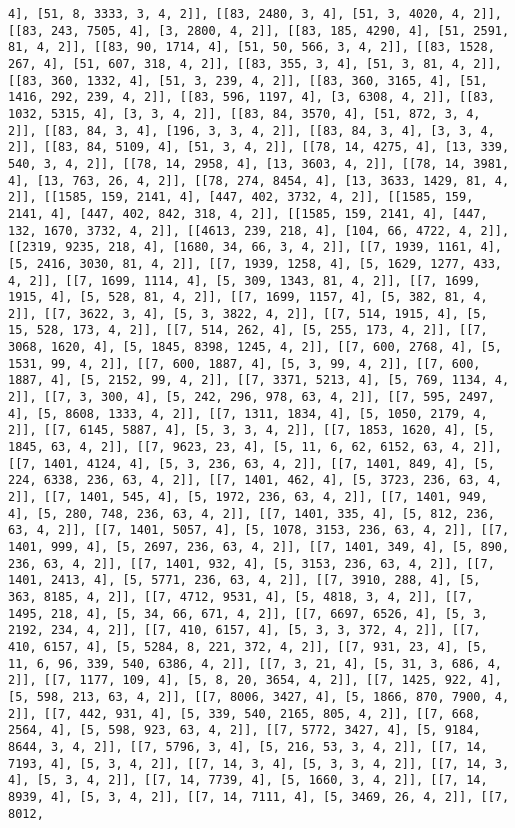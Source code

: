 \documentclass[12pt,fleqn]{article}\usepackage{../../common}
\begin{document}
\begin{verbatim}
4], [51, 8, 3333, 3, 4, 2]], [[83, 2480, 3, 4], [51, 3, 4020, 4, 2]], [[83, 243, 7505, 4], [3, 2800, 4, 2]], [[83, 185, 4290, 4], [51, 2591, 81, 4, 2]], [[83, 90, 1714, 4], [51, 50, 566, 3, 4, 2]], [[83, 1528, 267, 4], [51, 607, 318, 4, 2]], [[83, 355, 3, 4], [51, 3, 81, 4, 2]], [[83, 360, 1332, 4], [51, 3, 239, 4, 2]], [[83, 360, 3165, 4], [51, 1416, 292, 239, 4, 2]], [[83, 596, 1197, 4], [3, 6308, 4, 2]], [[83, 1032, 5315, 4], [3, 3, 4, 2]], [[83, 84, 3570, 4], [51, 872, 3, 4, 2]], [[83, 84, 3, 4], [196, 3, 3, 4, 2]], [[83, 84, 3, 4], [3, 3, 4, 2]], [[83, 84, 5109, 4], [51, 3, 4, 2]], [[78, 14, 4275, 4], [13, 339, 540, 3, 4, 2]], [[78, 14, 2958, 4], [13, 3603, 4, 2]], [[78, 14, 3981, 4], [13, 763, 26, 4, 2]], [[78, 274, 8454, 4], [13, 3633, 1429, 81, 4, 2]], [[1585, 159, 2141, 4], [447, 402, 3732, 4, 2]], [[1585, 159, 2141, 4], [447, 402, 842, 318, 4, 2]], [[1585, 159, 2141, 4], [447, 132, 1670, 3732, 4, 2]], [[4613, 239, 218, 4], [104, 66, 4722, 4, 2]], [[2319, 9235, 218, 4], [1680, 34, 66, 3, 4, 2]], [[7, 1939, 1161, 4], [5, 2416, 3030, 81, 4, 2]], [[7, 1939, 1258, 4], [5, 1629, 1277, 433, 4, 2]], [[7, 1699, 1114, 4], [5, 309, 1343, 81, 4, 2]], [[7, 1699, 1915, 4], [5, 528, 81, 4, 2]], [[7, 1699, 1157, 4], [5, 382, 81, 4, 2]], [[7, 3622, 3, 4], [5, 3, 3822, 4, 2]], [[7, 514, 1915, 4], [5, 15, 528, 173, 4, 2]], [[7, 514, 262, 4], [5, 255, 173, 4, 2]], [[7, 3068, 1620, 4], [5, 1845, 8398, 1245, 4, 2]], [[7, 600, 2768, 4], [5, 1531, 99, 4, 2]], [[7, 600, 1887, 4], [5, 3, 99, 4, 2]], [[7, 600, 1887, 4], [5, 2152, 99, 4, 2]], [[7, 3371, 5213, 4], [5, 769, 1134, 4, 2]], [[7, 3, 300, 4], [5, 242, 296, 978, 63, 4, 2]], [[7, 595, 2497, 4], [5, 8608, 1333, 4, 2]], [[7, 1311, 1834, 4], [5, 1050, 2179, 4, 2]], [[7, 6145, 5887, 4], [5, 3, 3, 4, 2]], [[7, 1853, 1620, 4], [5, 1845, 63, 4, 2]], [[7, 9623, 23, 4], [5, 11, 6, 62, 6152, 63, 4, 2]], [[7, 1401, 4124, 4], [5, 3, 236, 63, 4, 2]], [[7, 1401, 849, 4], [5, 224, 6338, 236, 63, 4, 2]], [[7, 1401, 462, 4], [5, 3723, 236, 63, 4, 2]], [[7, 1401, 545, 4], [5, 1972, 236, 63, 4, 2]], [[7, 1401, 949, 4], [5, 280, 748, 236, 63, 4, 2]], [[7, 1401, 335, 4], [5, 812, 236, 63, 4, 2]], [[7, 1401, 5057, 4], [5, 1078, 3153, 236, 63, 4, 2]], [[7, 1401, 999, 4], [5, 2697, 236, 63, 4, 2]], [[7, 1401, 349, 4], [5, 890, 236, 63, 4, 2]], [[7, 1401, 932, 4], [5, 3153, 236, 63, 4, 2]], [[7, 1401, 2413, 4], [5, 5771, 236, 63, 4, 2]], [[7, 3910, 288, 4], [5, 363, 8185, 4, 2]], [[7, 4712, 9531, 4], [5, 4818, 3, 4, 2]], [[7, 1495, 218, 4], [5, 34, 66, 671, 4, 2]], [[7, 6697, 6526, 4], [5, 3, 2192, 234, 4, 2]], [[7, 410, 6157, 4], [5, 3, 3, 372, 4, 2]], [[7, 410, 6157, 4], [5, 5284, 8, 221, 372, 4, 2]], [[7, 931, 23, 4], [5, 11, 6, 96, 339, 540, 6386, 4, 2]], [[7, 3, 21, 4], [5, 31, 3, 686, 4, 2]], [[7, 1177, 109, 4], [5, 8, 20, 3654, 4, 2]], [[7, 1425, 922, 4], [5, 598, 213, 63, 4, 2]], [[7, 8006, 3427, 4], [5, 1866, 870, 7900, 4, 2]], [[7, 442, 931, 4], [5, 339, 540, 2165, 805, 4, 2]], [[7, 668, 2564, 4], [5, 598, 923, 63, 4, 2]], [[7, 5772, 3427, 4], [5, 9184, 8644, 3, 4, 2]], [[7, 5796, 3, 4], [5, 216, 53, 3, 4, 2]], [[7, 14, 7193, 4], [5, 3, 4, 2]], [[7, 14, 3, 4], [5, 3, 3, 4, 2]], [[7, 14, 3, 4], [5, 3, 4, 2]], [[7, 14, 7739, 4], [5, 1660, 3, 4, 2]], [[7, 14, 8939, 4], [5, 3, 4, 2]], [[7, 14, 7111, 4], [5, 3469, 26, 4, 2]], [[7, 8012, 
\end{verbatim}
\end{document}
